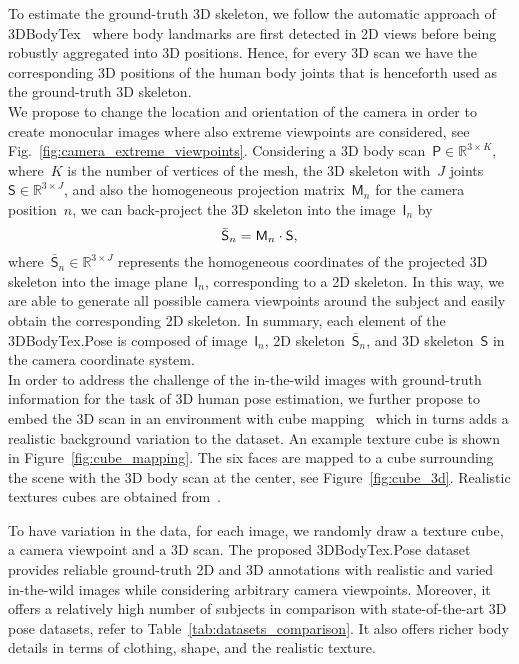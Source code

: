 \documentclass{article}
\def\m#1{\mathsf{#1}}
\begin{document}
 To estimate the ground-truth 3D skeleton, we follow the automatic approach of 3DBodyTex~\cite{Saint20183DBodyTexT3} where body landmarks are first detected in 2D views before being robustly aggregated into 3D positions. Hence, for every 3D scan we have the corresponding 3D positions of the human body joints that is henceforth used as the ground-truth 3D skeleton.\\ 
 We propose to change the location and orientation of the camera in order to create monocular images where also extreme viewpoints are considered, see Fig.~\ref{fig:camera_extreme_viewpoints}. Considering a 3D body scan~$\m P \in \mathbb{R}^{3 \times K}$, where~$K$ is the number of vertices of the mesh, the 3D skeleton with~$J$ joints~$\m S \in \mathbb{R}^{3 \times J}$, and also the homogeneous projection matrix~$\m M_n$ for the camera position~$n$, we can back-project the 3D skeleton into the image~$\m I_n$ by
\begin{equation}
    \vspace{-0.1cm}
    \centering
    \bar{\m S}_n = \m M_n \cdot \m S,
    \label{eq:reproject}
    \vspace{-0.1cm}
\end{equation}
where~$\bar{\m S}_n \in \mathbb{R}^{3 \times J}$ represents the homogeneous coordinates of the projected 3D skeleton into the image plane~$\m I_n$, corresponding to a 2D skeleton. In this way, we are able to generate all possible camera viewpoints around the subject and easily obtain the corresponding 2D skeleton. In summary, each element of the 3DBodyTex.Pose is composed of image~$\m I_n$, 2D skeleton~$\bar{\m S}_n$, and 3D skeleton~$\m S$ in the camera coordinate system.\\
 In order to address the challenge of the in-the-wild images with ground-truth information for the task of 3D human pose estimation, we further propose to embed the 3D scan in an environment with cube mapping~\cite{greene1986environment} which in turns adds a realistic background variation to the dataset. An example texture cube is shown in Figure~\ref{fig:cube_mapping}. The six faces are mapped to a cube surrounding the scene with the 3D body scan at the center, see Figure~\ref{fig:cube_3d}. Realistic textures cubes are obtained from~\cite{humus-cube}.

To have variation in the data, for each image, we randomly draw a texture cube, a camera viewpoint and a 3D scan. The proposed 3DBodyTex.Pose dataset provides reliable ground-truth 2D and 3D annotations with realistic and varied in-the-wild images while considering arbitrary camera viewpoints. Moreover, it offers a relatively high number of subjects in comparison with state-of-the-art 3D pose datasets, refer to Table~\ref{tab:datasets_comparison}. It also offers richer body details in terms of clothing, shape, and the realistic texture.
\end{document}
